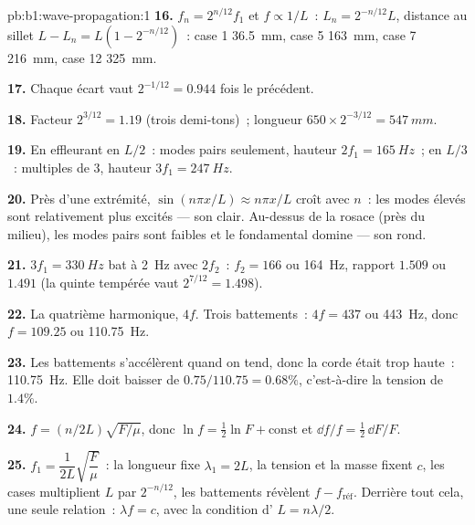 \begin{solution}{pb:b1:wave-propagation:1}
\textbf{16.} $f_n = 2^{n/12}f_1$ et $f \propto 1/L$~: $L_n = 2^{-n/12}L$,
distance au sillet $L - L_n = L(1 - 2^{-n/12})$~: case 1 \qty{36.5}{mm},
case 5 \qty{163}{mm}, case 7 \qty{216}{mm}, case 12 \qty{325}{mm}.

\textbf{17.} Chaque écart vaut $2^{-1/12} = 0.944$ fois le précédent.

\textbf{18.} Facteur $2^{3/12} = 1.19$ (trois demi-tons)~; longueur
$650 \times 2^{-3/12} = \qty{547}{mm}$.

\textbf{19.} En effleurant en $L/2$~: modes pairs seulement, hauteur $2f_1 =
\qty{165}{Hz}$~; en $L/3$~: multiples de $3$, hauteur $3f_1 = \qty{247}{Hz}$.

\textbf{20.} Près d'une extrémité, $\sin(n\pi x/L) \approx n\pi x/L$
croît avec $n$~: les modes élevés sont relativement plus excités ---
son clair. Au-dessus de la rosace (près du milieu), les modes pairs sont
faibles et le fondamental domine --- son rond.

\textbf{21.} $3f_1 = \qty{330}{Hz}$ bat à \qty{2}{Hz} avec $2f_2$~:
$f_2 = 166$ ou \qty{164}{Hz}, rapport $1.509$ ou $1.491$ (la quinte
tempérée vaut $2^{7/12} = 1.498$).

\textbf{22.} La quatrième harmonique, $4f$. Trois battements~: $4f = 437$ ou
\qty{443}{Hz}, donc $f = 109.25$ ou \qty{110.75}{Hz}.

\textbf{23.} Les battements s'accélèrent quand on tend, donc la corde
était trop haute~: \qty{110.75}{Hz}. Elle doit baisser de
$0.75/110.75 = 0.68\%$, c'est-à-dire la tension de $1.4\%$.

\textbf{24.} $f = (n/2L)\sqrt{F/\mu}$, donc $\ln f = \tfrac12\ln F + \text{const}$
et $\dd f/f = \tfrac12\,\dd F/F$.

\textbf{25.} $f_1 = \dfrac{1}{2L}\sqrt{\dfrac{F}{\mu}}$~: la longueur fixe
$\lambda_1 = 2L$, la tension et la masse fixent $c$, les cases
multiplient $L$ par $2^{-n/12}$, les battements révèlent $f - f_{\text{réf}}$.
Derrière tout cela, une seule relation~: $\lambda f = c$, avec la
condition d' $L = n\lambda/2$.
\end{solution}
